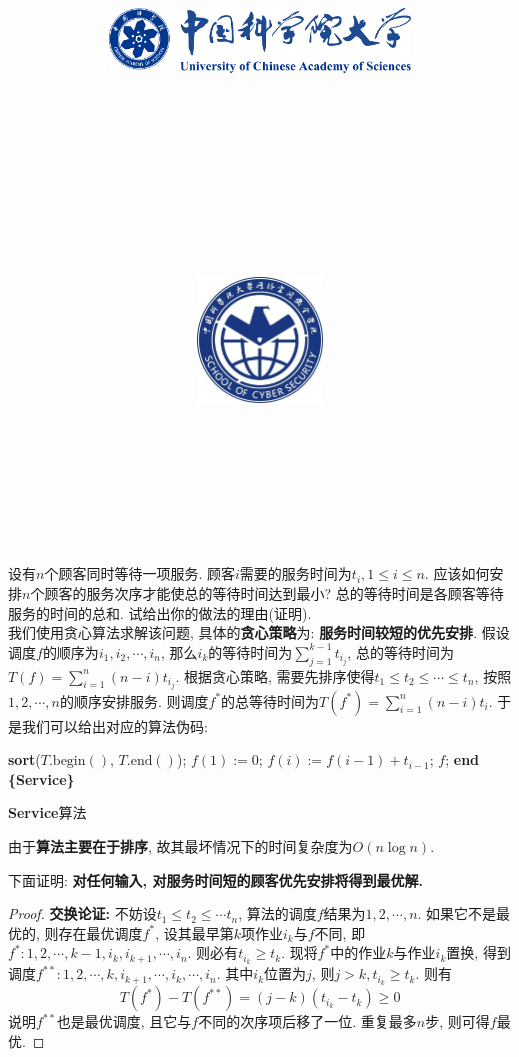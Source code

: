 \documentclass{article}
\title{
	\includegraphics[width=0.6\textwidth]{images/title/ucas_logo 1.pdf}\\
    \vspace{1in}
    \textmd{\textbf{\hmwkClass}}\\
	\textmd{\Large{\textbf{\hmwkClassID}}}\\
    \textmd{\textbf{\hmwkTitle}}\\
    \normalsize\vspace{0.1in}\large{\hmwkCompleteTime }\\
    \vspace{0.1in}\large{\textit{\hmwkClassInstructor\ }}\\
    \vspace{1in}
	\includegraphics[width=0.25\textwidth]{images/title/Cyber.jpg}\\
	\vspace{1in}
}
\author{
	\hmwkAuthorName \\ 
	\hmwkAuthorStuID \\
	\hmwkAuthorInst \\
	\hmwkAuthorzhuanye \\
	\hmwkAuthorfangxiang
	}
\date{}
\begin{document}
\maketitle


%
%
%
%
%


\pagebreak

\begin{homeworkProblem}
	设有$n$个顾客同时等待一项服务. 顾客$i$需要的服务时间为$t_i, 1 \leq i\leq n$. 应该如何安排$n$个顾客的服务次序才能使总的等待时间达到最小? 总的等待时间是各顾客等待服务的时间的总和. 试给出你的做法的理由(证明).
	\\

	\solution 我们使用贪心算法求解该问题, 具体的\textbf{贪心策略}为: \textbf{服务时间较短的优先安排}. 假设调度$f$的顺序为$i_1,i_2,\cdots, i_n$, 那么$i_k$的等待时间为$\displaystyle \sum_{j=1}^{k-1}{t_{i_j}}$, 总的等待时间为$\displaystyle T\left( f \right) =\sum_{i=1}^n{\left( n-i \right) t_{i_j}}$. 根据贪心策略, 需要先排序使得$t_1\leq t_2 \leq \cdots \leq t_n$, 按照$1,2,\cdots,n$的顺序安排服务. 则调度$f^{\ast}$的总等待时间为$\displaystyle T\left( f^{\ast} \right) =\sum_{i=1}^n{\left( n-i \right) t_i}$.
	于是我们可以给出对应的算法伪码:
	\begin{algorithm}[H]
		\begin{algorithmic}[1]
		\State \textbf{sort}($T.\text{begin}()$, $T.\text{end}()$); 
		\State $f(1):=0$;
			\State $f(i):=f(i-1)+t_{i-1}$;
		\EndFor
		\State \Return $f$;
		\State \textbf{end \{Service\}}
		\end{algorithmic}
		\caption{\textbf{Service}算法}
		\label{alg:Service}
	\end{algorithm}
	由于\textbf{算法主要在于排序}, 故其最坏情况下的时间复杂度为$O(n\log n)$. 
	
	下面证明: \textbf{对任何输入, 对服务时间短的顾客优先安排将得到最优解.}
	\begin{proof}
		\textbf{交换论证:} 不妨设$t_1\leq t_2\leq \cdots t_n$, 算法的调度$f$结果为$1,2,\cdots,n$. 如果它不是最优的, 则存在最优调度$f^*$, 设其最早第$k$项作业$i_k$与$f$不同, 即$f^*:1,2,\cdots,k-1,i_k,i_{k+1},\cdots,i_n$. 则必有$t_{i_{k}}\geq t_k$. 现将$f^*$中的作业$k$与作业$i_k$置换, 得到调度$f^{**}:1,2,\cdots,k,i_{k+1},\cdots,i_k,\cdots,i_n$. 其中$i_k$位置为$j$, 则$j>k,t_{i_{k}}\geq t_k$. 则有$$T\left( f^* \right) -T\left( f^{**} \right) =\left( j-k \right) \left( t_{i_k}-t_k \right) \ge 0
		$$
		说明$f^{**}$也是最优调度, 且它与$f$不同的次序项后移了一位. 重复最多$n$步, 则可得$f$最优.
	\end{proof}
\end{homeworkProblem}
\end{document}

